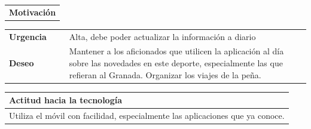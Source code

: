 \documentclass[11pt]{article}
\begin{document}
\begin{table}[H]
  \begin{tabular}{l}
    \textbf{Motivación} 
  \end{tabular}

  \begin{tabular}{p{0.2\linewidth}|p{0.8\linewidth}}
    \toprule
    \textbf{Urgencia} & Alta, debe poder actualizar la información a diario\\
    \textbf{Deseo}  & Mantener a los aficionados que utilicen la aplicación al día sobre las novedades en este deporte, especialmente las que refieran al Granada. Organizar los viajes de la peña.\\
    \bottomrule
  \end{tabular}

  \begin{tabular}{p{1.028\linewidth}}
    \textbf{Actitud hacia la tecnología}\\
    \midrule
    Utiliza el móvil con facilidad, especialmente las aplicaciones que ya conoce. 
  \end{tabular}
\end{table}
\end{document}
